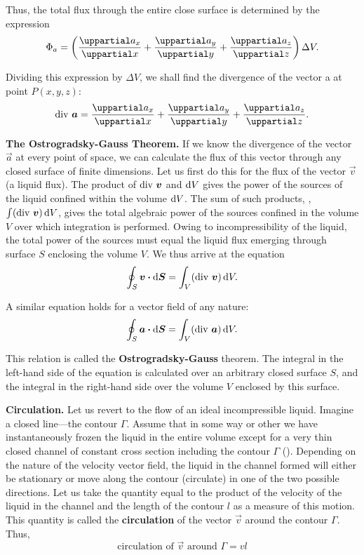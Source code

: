 Thus, the total flux through the entire close surface is determined by the expression
\begin{equation*}
	\Phi_a = \parenthesis{\diffpartial{a_x}{x} + \diffpartial{a_y}{y} + \diffpartial{a_z}{z}}\Delta{V}.
\end{equation*}

\noindent
Dividing this expression by $\Delta{V}$, we shall find the divergence of the vector a at point $P(x, y, z)$:
\begin{equation}\label{eq:1_81}
	\diverg{\vec{a}} = \diffpartial{a_x}{x} + \diffpartial{a_y}{y} + \diffpartial{a_z}{z}.
\end{equation}

\textbf{The Ostrogradsky-Gauss Theorem.} If we know the divergence of the vector $\vec{a}$ at every point of space, we can calculate the flux of this vector through any closed surface of finite dimensions. Let us first do this for the flux of the vector $\vec{v}$ (a liquid flux). The product of $\text{div~}\boldsymbol{v}$ and $\mathrm{d} V$ gives the power of the sources of the liquid confined within the volume $\mathrm{d} V$. The sum of such products, \ie, $\int(\text{div~}\boldsymbol{v})\,\mathrm{d} V$, gives the total algebraic power of the sources confined in the volume $V$ over which integration is performed. Owing to incompressibility of the liquid, the total power of the sources must equal the liquid flux emerging through surface $S$ enclosing the volume $V$. We thus arrive at the equation
\begin{equation*}
	\oint_S \boldsymbol{v} \boldsymbol{\cdot} \mathrm{d}\boldsymbol{S} = \int_V (\text{div~}\boldsymbol{v})\,\mathrm{d} V.
\end{equation*}

\noindent
A similar equation holds for a vector field of any nature:
\begin{equation}\label{eq:1_82}
	\oint_S \boldsymbol{a} \boldsymbol{\cdot} \mathrm{d}\boldsymbol{S} = \int_V (\text{div~}\boldsymbol{a})\,\mathrm{d} V.
\end{equation}

\noindent
This relation is called the \textbf{Ostrogradsky-Gauss} theorem. The integral in the left-hand side of the equation is calculated over an arbitrary closed surface $S$, and the integral in the right-hand side over the volume $V$ enclosed by this surface.

\textbf{Circulation.} Let us revert to the flow of an ideal incompressible liquid. Imagine a closed line---the contour $\Gamma$. Assume that in some way or other we have instantaneously frozen the
liquid in the entire volume except for a very thin closed channel of constant cross section including the contour $\Gamma$ (). Depending on the nature of the velocity vector field, the liquid in the channel formed will either be stationary or move along the contour (circulate) in one of the two possible directions. Let us take the quantity equal to the product of the velocity of the liquid in the channel and the length of the contour $l$ as a measure of this motion. This quantity is called the \textbf{circulation} of the vector $\vec{v}$ around the contour $\Gamma$. Thus,
\begin{equation*}
	\text{circulation of $\vec{v}$ around $\Gamma$} = vl
\end{equation*}

